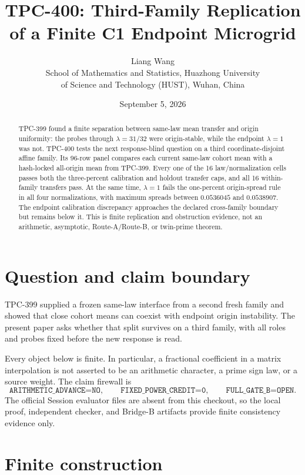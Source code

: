 \documentclass[10pt]{article}
\title{TPC-400: Third-Family Replication of a Finite C1 Endpoint Microgrid}
\author{Liang Wang\\
School of Mathematics and Statistics, Huazhong University\\
of Science and Technology (HUST), Wuhan, China}
\date{September 5, 2026}
\begin{document}
\maketitle

\begin{abstract}
TPC-399 found a finite separation between same-law mean transfer and origin
uniformity: the probes through $\lambda=31/32$ were origin-stable, while the
endpoint $\lambda=1$ was not.  TPC-400 tests the next response-blind question
on a third coordinate-disjoint affine family.  Its 96-row panel compares each
current same-law cohort mean with a hash-locked all-origin mean from TPC-399.
Every one of the 16 law/normalization cells passes both the three-percent
calibration and holdout transfer caps, and all 16 within-family transfers pass.
At the same time, $\lambda=1$ fails the one-percent origin-spread rule in all
four normalizations, with maximum spreads between $0.0536045$ and
$0.0538907$.  The endpoint calibration discrepancy approaches the declared
cross-family boundary but remains below it.  This is finite replication and
obstruction evidence, not an arithmetic, asymptotic, Route-A/Route-B, or
twin-prime theorem.
\end{abstract}

\section{Question and claim boundary}

TPC-399 supplied a frozen same-law interface from a second fresh family and
showed that close cohort means can coexist with endpoint origin instability.
The present paper asks whether that split survives on a third family, with all
roles and probes fixed before the new response is read.

Every object below is finite.  In particular, a fractional coefficient in a
matrix interpolation is not asserted to be an arithmetic character, a prime
sign law, or a source weight.  The claim firewall is
\[
 \texttt{ARITHMETIC\_ADVANCE=NO},\qquad
 \texttt{FIXED\_POWER\_CREDIT=0},\qquad
 \texttt{FULL\_GATE\_B=OPEN}.
\]
The official Session evaluator files are absent from this checkout, so the
local proof, independent checker, and Bridge-B artifacts provide finite
consistency evidence only.

\section{Finite construction}
\end{document}

